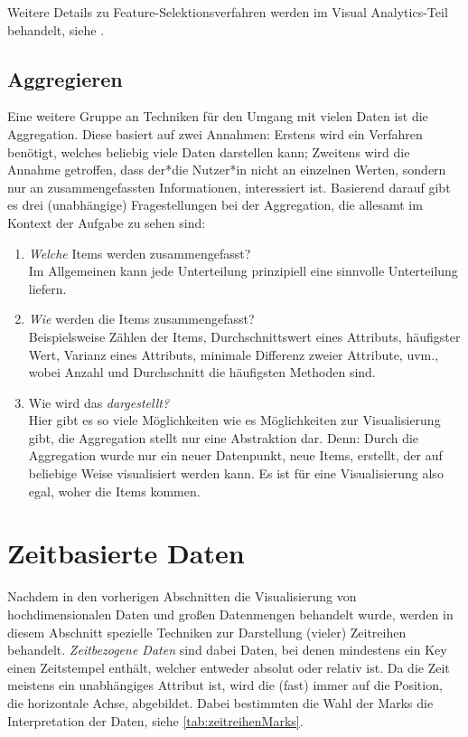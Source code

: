 				Weitere Details zu Feature-Selektionsverfahren werden im Visual Analytics-Teil behandelt, siehe .

		\subsection{Aggregieren}
			Eine weitere Gruppe an Techniken für den Umgang mit vielen Daten ist die Aggregation. Diese basiert auf zwei Annahmen: Erstens wird ein Verfahren benötigt, welches beliebig viele Daten darstellen kann; Zweitens wird die Annahme getroffen, dass der*die Nutzer*in nicht an einzelnen Werten, sondern nur an zusammengefassten Informationen, interessiert ist. Basierend darauf gibt es drei (unabhängige) Fragestellungen bei der Aggregation, die allesamt im Kontext der Aufgabe zu sehen sind:
			\begin{enumerate}
				\item \emph{Welche} Items werden zusammengefasst? \\
					Im Allgemeinen kann jede Unterteilung prinzipiell eine sinnvolle Unterteilung liefern.
				\item \emph{Wie} werden die Items zusammengefasst? \\
					Beispielsweise Zählen der Items, Durchschnittswert eines Attributs, häufigster Wert, Varianz eines Attributs, minimale Differenz zweier Attribute, uvm., wobei Anzahl und Durchschnitt die häufigsten Methoden sind.
				\item Wie wird das \emph{dargestellt?} \\
					Hier gibt es so viele Möglichkeiten wie es Möglichkeiten zur Visualisierung gibt, die Aggregation stellt nur eine Abstraktion dar. Denn: Durch die Aggregation wurde nur ein neuer Datenpunkt, \bzw neue Items, erstellt, der auf beliebige Weise visualisiert werden kann. Es ist für eine Visualisierung also egal, woher die Items kommen.
			\end{enumerate}

	\section{Zeitbasierte Daten}
		\label{sec:visZeitbasiert}

		Nachdem in den vorherigen Abschnitten die Visualisierung von hochdimensionalen Daten und großen Datenmengen behandelt wurde, werden in diesem Abschnitt spezielle Techniken zur Darstellung (vieler) Zeitreihen behandelt. \emph{Zeitbezogene Daten} sind dabei Daten, bei denen mindestens ein Key einen Zeitstempel enthält, welcher entweder absolut oder relativ ist. Da die Zeit meistens ein unabhängiges Attribut ist, wird die (fast) immer auf die Position, \zB die horizontale Achse, abgebildet. Dabei bestimmten die Wahl der Marks die Interpretation der Daten, siehe \autoref{tab:zeitreihenMarks}.

